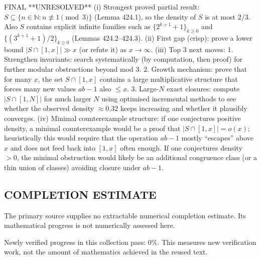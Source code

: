 FINAL
**UNRESOLVED**
(i) Strongest proved partial result: $S\subseteq\{n\in\mathbb N: n\not\equiv 1\pmod 3\}$ (Lemma 424.1), so the density of $S$ is at most $2/3$. Also $S$ contains explicit infinite families such as $\{2^{k+1}+1\}_{k\ge 0}$ and $\{(3^{k+1}+1)/2\}_{k\ge 0}$ (Lemmas 424.2–424.3).
(ii) First gap (crisp): prove a lower bound $|S\cap[1,x]|\gg x$ (or refute it) as $x\to\infty$.
(iii) Top 3 next moves:
  1. Strengthen invariants: search systematically (by computation, then proof) for further modular obstructions beyond mod $3$.
  2. Growth mechanism: prove that for many $x$, the set $S\cap[1,x]$ contains a large multiplicative structure that forces many new values $ab-1$ also $\le x$.
  3. Large-$N$ exact closures: compute $|S\cap[1,N]|$ for much larger $N$ using optimised incremental methods to see whether the observed density $\approx 0.32$ keeps increasing and whether it plausibly converges.
(iv) Minimal counterexample structure: if one conjectures positive density, a minimal counterexample would be a proof that $|S\cap[1,x]|=o(x)$; heuristically this would require that the operation $ab-1$ mostly “escapes” above $x$ and does not feed back into $[1,x]$ often enough. If one conjectures density $>0$, the minimal obstruction would likely be an additional congruence class (or a thin union of classes) avoiding closure under $ab-1$.




\subsection*{COMPLETION ESTIMATE}
The primary source supplies no extractable numerical completion estimate. Its mathematical progress is not numerically assessed here.

Newly verified progress in this collection pass: $0\%$. This measures new verification work, not the amount of mathematics achieved in the reused text.
